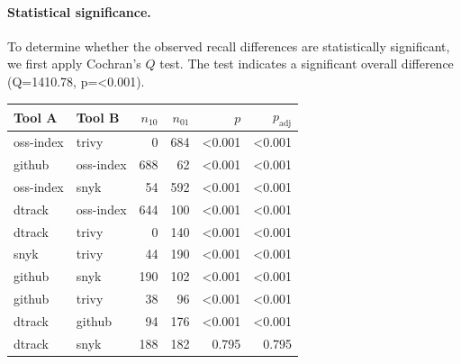 \paragraph{Statistical significance.}
To determine whether the observed recall differences are statistically significant, we first apply Cochran's $Q$ test. The test indicates a significant overall difference (Q=1410.78, p=<0.001).

\begin{table}[!t]
\centering
\small
\begin{tabular}{llrrrr}
\toprule
Tool A & Tool B & $n_{10}$ & $n_{01}$ & $p$ & $p_{\mathrm{adj}}$ \\
\midrule
oss-index & trivy & 0 & 684 & <0.001 & <0.001 \\
github & oss-index & 688 & 62 & <0.001 & <0.001 \\
oss-index & snyk & 54 & 592 & <0.001 & <0.001 \\
dtrack & oss-index & 644 & 100 & <0.001 & <0.001 \\
dtrack & trivy & 0 & 140 & <0.001 & <0.001 \\
snyk & trivy & 44 & 190 & <0.001 & <0.001 \\
github & snyk & 190 & 102 & <0.001 & <0.001 \\
github & trivy & 38 & 96 & <0.001 & <0.001 \\
dtrack & github & 94 & 176 & <0.001 & <0.001 \\
dtrack & snyk & 188 & 182 & 0.795 & 0.795 \\
\bottomrule
\end{tabular}
\end{table}
